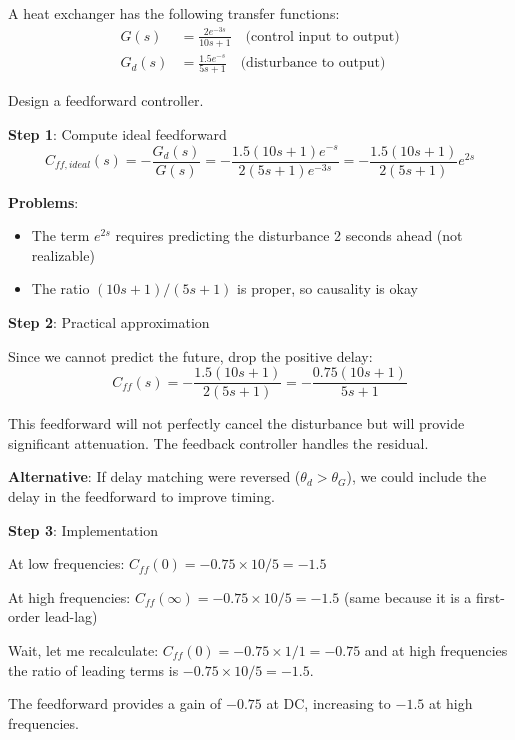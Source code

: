 \begin{example}
\label{ex:ff_design}
A heat exchanger has the following transfer functions:
\begin{align}
G(s) &= \frac{2e^{-3s}}{10s + 1} \quad \text{(control input to output)} \\
G_d(s) &= \frac{1.5e^{-s}}{5s + 1} \quad \text{(disturbance to output)}
\end{align}

Design a feedforward controller.

\textbf{Step 1}: Compute ideal feedforward
\begin{equation}
C_{ff,ideal}(s) = -\frac{G_d(s)}{G(s)} = -\frac{1.5(10s+1)e^{-s}}{2(5s+1)e^{-3s}} = -\frac{1.5(10s+1)}{2(5s+1)} e^{2s}
\end{equation}

\textbf{Problems}:
\begin{itemize}
    \item The term $e^{2s}$ requires predicting the disturbance 2 seconds ahead (not realizable)
    \item The ratio $(10s+1)/(5s+1)$ is proper, so causality is okay
\end{itemize}

\textbf{Step 2}: Practical approximation

Since we cannot predict the future, drop the positive delay:
\begin{equation}
C_{ff}(s) = -\frac{1.5(10s+1)}{2(5s+1)} = -\frac{0.75(10s+1)}{5s+1}
\end{equation}

This feedforward will not perfectly cancel the disturbance but will provide significant attenuation. The feedback controller handles the residual.

\textbf{Alternative}: If delay matching were reversed ($\theta_d > \theta_G$), we could include the delay in the feedforward to improve timing.

\textbf{Step 3}: Implementation

At low frequencies: $C_{ff}(0) = -0.75 \times 10 / 5 = -1.5$

At high frequencies: $C_{ff}(\infty) = -0.75 \times 10 / 5 = -1.5$ (same because it is a first-order lead-lag)

Wait, let me recalculate: $C_{ff}(0) = -0.75 \times 1/1 = -0.75$ and at high frequencies the ratio of leading terms is $-0.75 \times 10/5 = -1.5$.

The feedforward provides a gain of $-0.75$ at DC, increasing to $-1.5$ at high frequencies.
\end{example}

